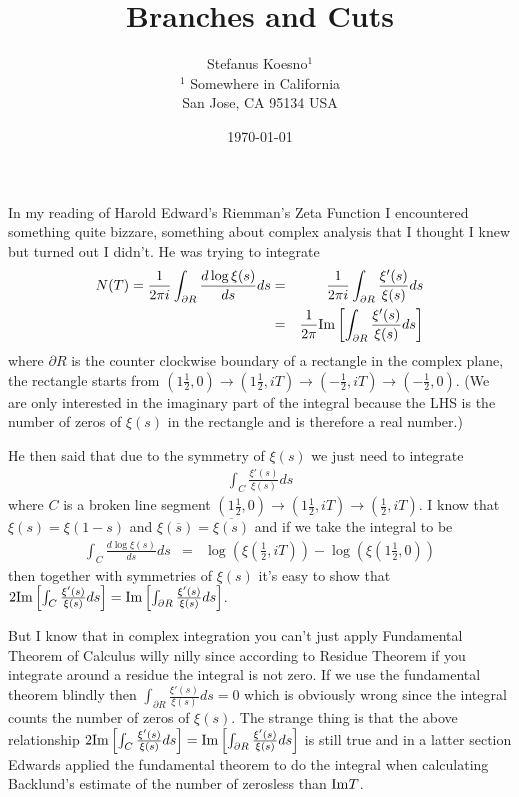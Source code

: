 \documentclass[aps,preprint,preprintnumbers,nofootinbib,showpacs,prd]{revtex4-1}
\newcommand{\nbea}{\begin{eqnarray*}}
\newcommand{\neea}{\end{eqnarray*}}
\def\Im{{\rm Im}}
\begin{document}
\title{Branches and Cuts}
\bigskip
\author{Stefanus Koesno$^1$\\
$^1$ Somewhere in California\\ San Jose, CA 95134 USA\\
}
%
\date{\today}
%
\begin{abstract}

\end{abstract}
%
\maketitle

\renewcommand{\theequation}{A.\arabic{equation}}  %
\setcounter{equation}{0}  %

In my reading of Harold Edward's Riemman's Zeta Function I encountered something quite bizzare, something about complex analysis that I thought I knew but turned out I didn't. He was trying to integrate 
%
\nbea
N(T) = \frac{1}{2\pi i} \int_{\partial R} \frac{d\log \xi(s)}{ds} ds & = & \frac{1}{2\pi i} \int_{\partial R} \frac{\xi'(s)}{\xi(s)} ds \\
& = & \frac{1}{2\pi} \Im \left \lbrack \int_{\partial R} \frac{\xi'(s)}{\xi(s)} ds \right \rbrack
\neea
%
where $\partial R$ is the counter clockwise boundary of a rectangle in the complex plane, the rectangle starts from $(1\tfrac{1}{2}, 0) \to (1\tfrac{1}{2}, iT) \to (-\tfrac{1}{2}, iT) \to (-\tfrac{1}{2},0)$. (We are only interested in the imaginary part of the integral because the LHS is the number of zeros of $\xi(s)$ in the rectangle and is therefore a real number.)

He then said that due to the symmetry of $\xi(s)$ we just need to integrate
%
\nbea
\int_{C} \frac{\xi'(s)}{\xi(s)} ds
\neea
%
where $C$ is a broken line segment $(1\tfrac{1}{2}, 0) \to (1\tfrac{1}{2}, iT) \to (\tfrac{1}{2}, iT)$. I know that $\xi(s) = \xi(1-s)$ and $\xi(\overline{s}) = \overline{\xi(s)}$ and if we take the integral to be
%
\nbea
\int_{C} \frac{d\log \xi(s)}{ds} ds & = & \log (\xi(\tfrac{1}{2}, iT)) - \log (\xi(1\tfrac{1}{2}, 0))
\neea
%
then together with symmetries of $\xi(s)$ it's easy to show that $2 \Im \left \lbrack \int_{C} \frac{\xi'(s)}{\xi(s)} ds \right \rbrack = \Im \left \lbrack \int_{\partial R} \frac{\xi'(s)}{\xi(s)} ds \right \rbrack$.

But I know that in complex integration you can't just apply Fundamental Theorem of Calculus willy nilly since according to Residue Theorem if you integrate around a residue the integral is not zero. If we use the fundamental theorem blindly then $\int_{\partial R} \frac{\xi'(s)}{\xi(s)} ds = 0$ which is obviously wrong since the integral counts the number of zeros of $\xi(s)$. The strange thing is that the above relationship $2 \Im \left \lbrack \int_{C} \frac{\xi'(s)}{\xi(s)} ds \right \rbrack = \Im \left \lbrack \int_{\partial R} \frac{\xi'(s)}{\xi(s)} ds \right \rbrack$ is still true and in a latter section Edwards applied the fundamental theorem to do the integral when calculating Backlund's estimate of the number of zerosless than $\Im T$.
\end{document}
